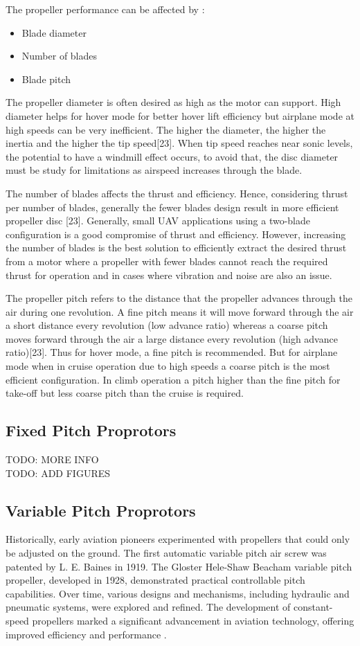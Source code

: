 The propeller performance can be affected by \cite{main_uav}:
\begin{itemize}
    \item Blade diameter
    \item Number of blades
    \item Blade pitch
\end{itemize}

The propeller diameter is often desired as high as the motor can support.
High diameter helps for hover mode for better hover lift efficiency but airplane mode at high speeds can be very inefficient.
The higher the diameter, the higher the inertia and the higher the tip speed[23].
When tip speed reaches near sonic levels, the potential to have a windmill effect occurs, to avoid that, the disc diameter must be study for limitations as airspeed increases through the blade.

The number of blades affects the thrust and efficiency.
Hence, considering thrust per number of blades, generally the fewer blades design result in more efficient propeller disc [23].
Generally, small UAV applications using a two-blade configuration is a good compromise of thrust and efficiency.
However, increasing the number of blades is the best solution to efficiently extract the desired thrust from a motor where a propeller with fewer blades cannot reach the required thrust for operation and in cases where vibration and noise are also an issue.

The propeller pitch refers to the distance that the propeller advances through the air during one revolution.
A fine pitch means it will move forward through the air a short distance every revolution (low advance ratio) whereas a coarse pitch moves forward through the air a large distance every revolution (high advance ratio)[23].
Thus for hover mode, a fine pitch is recommended.
But for airplane mode when in cruise operation due to high speeds a coarse pitch is the most efficient configuration.
In climb operation a pitch higher than the fine pitch for take-off but less coarse pitch than the cruise is required.

\subsection{Fixed Pitch Proprotors}
TODO: MORE INFO\\
TODO: ADD FIGURES

\subsection{Variable Pitch Proprotors}
Historically, early aviation pioneers experimented with propellers that could only be adjusted on the ground.
The first automatic variable pitch air screw was patented by L. E. Baines in 1919.
The Gloster Hele-Shaw Beacham variable pitch propeller, developed in 1928, demonstrated practical controllable pitch capabilities.
Over time, various designs and mechanisms, including hydraulic and pneumatic systems, were explored and refined.
The development of constant-speed propellers marked a significant advancement in aviation technology, offering improved efficiency and performance \cite{VPP2}.\\


